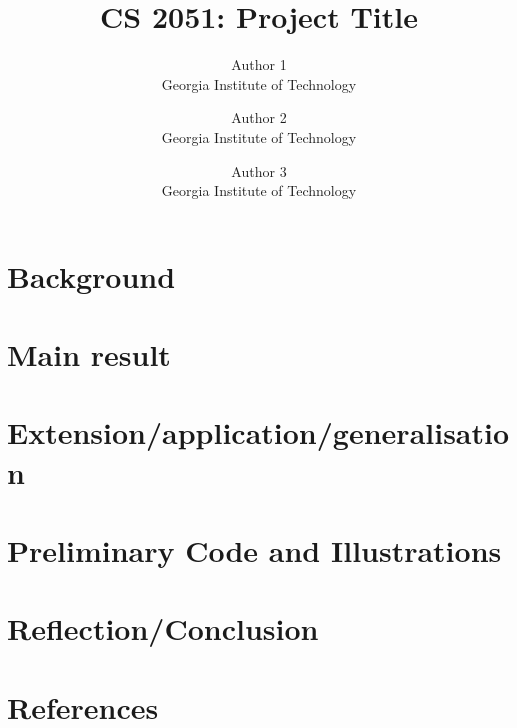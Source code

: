\documentclass{article}
\title{CS 2051: Project Title}
\author{Author 1 \\ Georgia Institute of Technology
\and Author 2 \\ Georgia Institute of Technology
\and Author 3 \\ Georgia Institute of Technology}
\date{}
\begin{document}
\maketitle

\section{Background}


\section{Main result}


\section{Extension/application/generalisation}


\section{Preliminary Code and Illustrations}


\section{Reflection/Conclusion}


\section{References}
    

 
\end{document}
